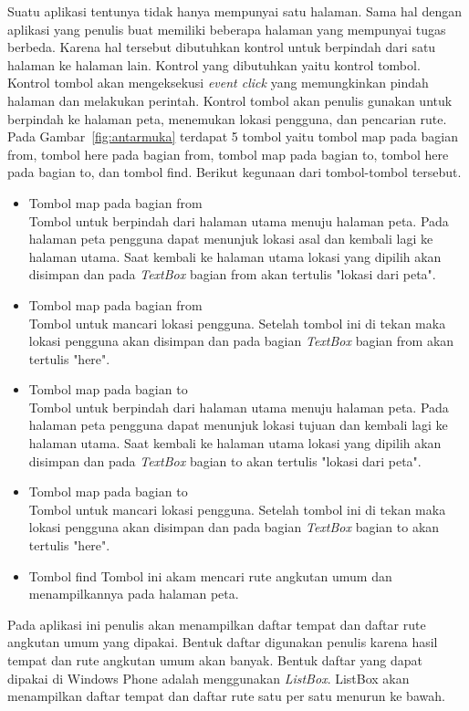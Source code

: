\hspace{0.5cm} Suatu aplikasi tentunya tidak hanya mempunyai satu halaman. Sama hal dengan aplikasi yang penulis buat memiliki beberapa halaman yang mempunyai tugas berbeda. Karena hal tersebut dibutuhkan kontrol untuk berpindah dari satu halaman ke halaman lain. Kontrol yang dibutuhkan yaitu kontrol tombol. Kontrol tombol akan mengeksekusi \textit{event click} yang memungkinkan pindah halaman dan melakukan perintah. Kontrol tombol akan penulis gunakan untuk berpindah ke halaman peta, menemukan lokasi pengguna, dan pencarian rute. Pada Gambar~\ref{fig:antarmuka} terdapat 5 tombol yaitu tombol map pada bagian from, tombol here pada bagian from, tombol map pada bagian to, tombol here pada bagian to, dan tombol find. Berikut kegunaan dari tombol-tombol tersebut.
\begin{itemize}
	\item Tombol map pada bagian from\\
	Tombol untuk berpindah dari halaman utama menuju halaman peta. Pada halaman peta pengguna dapat menunjuk lokasi asal dan kembali lagi ke halaman utama. Saat kembali ke halaman utama lokasi yang dipilih akan disimpan dan pada \textit{TextBox} bagian from akan tertulis "lokasi dari peta".
	\item Tombol map pada bagian from\\
	Tombol untuk mancari lokasi pengguna. Setelah tombol ini di tekan maka lokasi pengguna akan disimpan dan pada bagian \textit{TextBox} bagian from akan tertulis "here".
	\item Tombol map pada bagian to\\
	Tombol untuk berpindah dari halaman utama menuju halaman peta. Pada halaman peta pengguna dapat menunjuk lokasi tujuan dan kembali lagi ke halaman utama. Saat kembali ke halaman utama lokasi yang dipilih akan disimpan dan pada \textit{TextBox} bagian to akan tertulis "lokasi dari peta".
	\item Tombol map pada bagian to\\
	Tombol untuk mancari lokasi pengguna. Setelah tombol ini di tekan maka lokasi pengguna akan disimpan dan pada bagian \textit{TextBox} bagian to akan tertulis "here".
	\item Tombol find 
	Tombol ini akam mencari rute angkutan umum dan menampilkannya pada halaman peta.
\end{itemize}

\hspace{0.5cm} Pada aplikasi ini penulis akan menampilkan daftar tempat dan daftar rute angkutan umum yang dipakai. Bentuk daftar digunakan penulis karena hasil tempat dan rute angkutan umum akan banyak. Bentuk daftar yang dapat dipakai di Windows Phone adalah menggunakan \textit{ListBox}. ListBox akan menampilkan daftar tempat dan daftar rute satu per satu menurun ke bawah.

